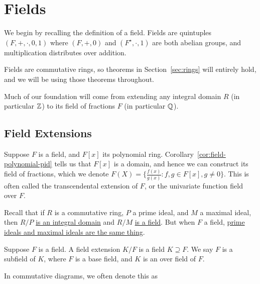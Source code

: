 \section{Fields}

\begin{remark}
    We begin by recalling the definition of a field.
    Fields are quintuples \((F,+,\cdot,0,1)\) where
    \((F,+,0)\) and \((F^\star,\cdot,1)\) are both abelian groups,
    and multiplication distributes over addition.
\end{remark}
\begin{remark}
    Fields are commutative rings,
    so theorems in Section~\ref{sec:rings} will entirely hold,
    and we will be using those theorems throughout.
\end{remark}
\begin{remark}
    Much of our foundation will come from extending any integral domain \(R\)
    (in particular \(\mathbb{Z}\))
    to its field of fractions \(F\) (in particular \(\mathbb{Q}\)).
\end{remark}


\subsection{Field Extensions}

\begin{definition}
    Suppose \(F\) is a field, and \(F[x]\) its polynomial ring.
    Corollary~\ref{cor:field-polynomial-pid} tells us that
    \(F[x]\) is a domain,
    and hence we can construct its field of fractions,
    which we denote \(F(X) = \{\frac{f(x)}{g(x)} : f,g \in F[x], g \neq 0\}\).
    This is often called the transcendental extension of \(F\),
    or the univariate function field over \(F\).
\end{definition}

\begin{remark}
    Recall that if \(R\) is a commutative ring,
    \(P\) a prime ideal, and \(M\) a maximal ideal,
    then \(R/P\) \hyperref[prop:prime-quotient-domain]{is an integral domain}
    and \(R/M\) \hyperref[cor:maximal-quotient-field]{is a field}.
    But when \(F\) a field,
    \hyperref[prop:pid-maximal-is-prime]{prime ideals and maximal ideals are the same thing}.
\end{remark}

\begin{definition}
    Suppose \(F\) is a field.
    A field extension \(K/F\) is a field \(K \supseteq F\).
    We say \(F\) is a subfield of \(K\),
    where \(F\) is a base field, and \(K\) is an over field of \(F\).

    In commutative diagrams, we often denote this as
    \begin{center}
    \end{center}
\end{definition}

